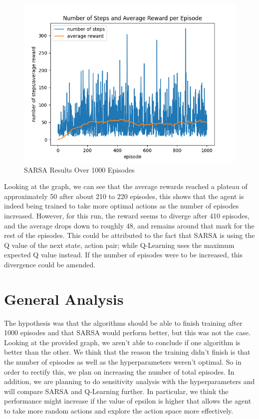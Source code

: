 \documentclass[nohyperref]{article}
\theoremstyle{plain}
\theoremstyle{definition}
\theoremstyle{remark}
\begin{document}
\begin{figure}[H] %
    \centering
    \includegraphics[width=1\linewidth]{sarsa-average-1k.png}
    \caption{SARSA Results Over 1000 Episodes}
\end{figure}

Looking at the graph, we can see that the average rewards reached a plateau of approximately 50 after about 210 to 220 episodes, this shows that the agent is indeed being trained to
take more optimal actions as the number of episodes increased. However, for this run, the reward seems to diverge after 410 episodes, and the average drops down to roughly 48, and remains around
that mark for the rest of the episodes. This could be attributed to the fact that SARSA is using the Q value of the next state, action pair; while Q-Learning uses the maximum expected Q value instead.
If the number of episodes were to be increased, this divergence could be amended.

\section{General Analysis}

The hypothesis was that the algorithms should be able to finish training after 1000 episodes and that SARSA would perform better, but this was not the case.
Looking at the provided graph, we aren't able to conclude if one algorithm is better than the other.
We think that the reason the training didn't finish is that the number of episodes as well as the hyperparameters weren't optimal. 
So in order to rectify this, we plan on increasing the number of total episodes. 
In addition, we are planning to do sensitivity analysis with the hyperparameters and will compare SARSA and Q-Learning further.
In particular, we think the performance might increase if the value of epsilon is higher that allows the agent to take more random actions and explore the action space more effectively.
\end{document}
